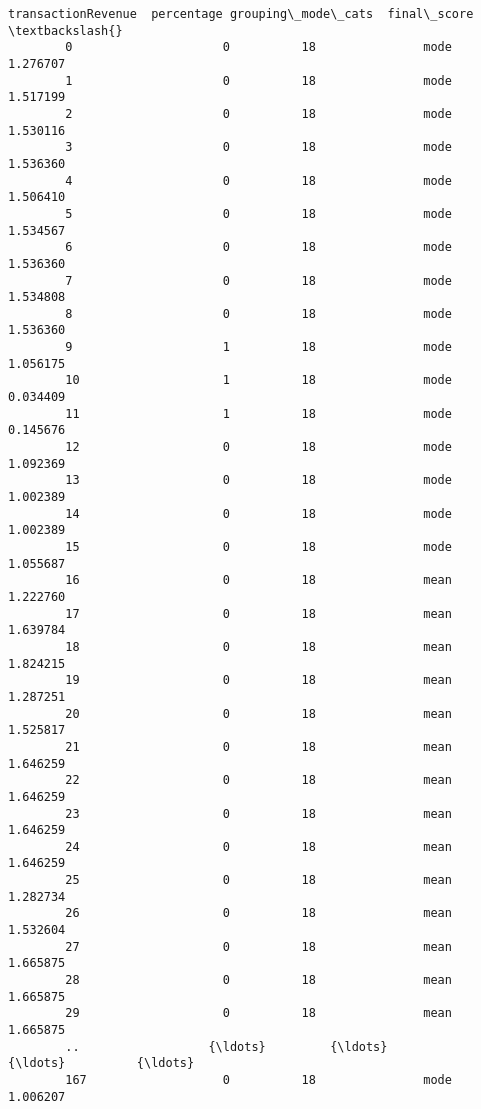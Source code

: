 \documentclass[11pt]{article}
\begin{document}
\begin{Verbatim}[commandchars=\\\{\}]
             transactionRevenue  percentage grouping\_mode\_cats  final\_score  \textbackslash{}
        0                     0          18               mode     1.276707   
        1                     0          18               mode     1.517199   
        2                     0          18               mode     1.530116   
        3                     0          18               mode     1.536360   
        4                     0          18               mode     1.506410   
        5                     0          18               mode     1.534567   
        6                     0          18               mode     1.536360   
        7                     0          18               mode     1.534808   
        8                     0          18               mode     1.536360   
        9                     1          18               mode     1.056175   
        10                    1          18               mode     0.034409   
        11                    1          18               mode     0.145676   
        12                    0          18               mode     1.092369   
        13                    0          18               mode     1.002389   
        14                    0          18               mode     1.002389   
        15                    0          18               mode     1.055687   
        16                    0          18               mean     1.222760   
        17                    0          18               mean     1.639784   
        18                    0          18               mean     1.824215   
        19                    0          18               mean     1.287251   
        20                    0          18               mean     1.525817   
        21                    0          18               mean     1.646259   
        22                    0          18               mean     1.646259   
        23                    0          18               mean     1.646259   
        24                    0          18               mean     1.646259   
        25                    0          18               mean     1.282734   
        26                    0          18               mean     1.532604   
        27                    0          18               mean     1.665875   
        28                    0          18               mean     1.665875   
        29                    0          18               mean     1.665875   
        ..                  {\ldots}         {\ldots}                {\ldots}          {\ldots}   
        167                   0          18               mode     1.006207   

\end{Verbatim}
\end{document}
